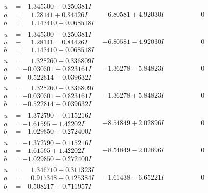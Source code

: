 \documentclass[1p]{elsarticle_modified}
\theoremstyle{definition}
\begin{document}
$$\begin{array}{c|c|c}
\begin{aligned}
u &= -1.345300 + 0.250381 I \\
a &= \phantom{-}1.28141 + 0.84426 I \\
b &= \phantom{-}1.143410 + 0.068518 I\end{aligned}
 & -6.80581 + 4.92030 I & \phantom{-0.000000 } 0 \\ \hline\begin{aligned}
u &= -1.345300 - 0.250381 I \\
a &= \phantom{-}1.28141 - 0.84426 I \\
b &= \phantom{-}1.143410 - 0.068518 I\end{aligned}
 & -6.80581 - 4.92030 I & \phantom{-0.000000 } 0 \\ \hline\begin{aligned}
u &= \phantom{-}1.328260 + 0.336809 I \\
a &= -0.030301 + 0.823161 I \\
b &= -0.522814 - 0.039632 I\end{aligned}
 & -1.36278 - 5.84823 I & \phantom{-0.000000 } 0 \\ \hline\begin{aligned}
u &= \phantom{-}1.328260 - 0.336809 I \\
a &= -0.030301 - 0.823161 I \\
b &= -0.522814 + 0.039632 I\end{aligned}
 & -1.36278 + 5.84823 I & \phantom{-0.000000 } 0 \\ \hline\begin{aligned}
u &= -1.372790 + 0.115216 I \\
a &= -1.61595 - 1.42202 I \\
b &= -1.029850 + 0.272400 I\end{aligned}
 & -8.54849 + 2.02896 I & \phantom{-0.000000 } 0 \\ \hline\begin{aligned}
u &= -1.372790 - 0.115216 I \\
a &= -1.61595 + 1.42202 I \\
b &= -1.029850 - 0.272400 I\end{aligned}
 & -8.54849 - 2.02896 I & \phantom{-0.000000 } 0 \\ \hline\begin{aligned}
u &= \phantom{-}1.346710 + 0.311323 I \\
a &= \phantom{-}0.917348 + 0.125384 I \\
b &= -0.508217 + 0.711957 I\end{aligned}
 & -1.61438 - 6.65221 I & \phantom{-0.000000 } 0 \\ \hline\begin{aligned}

\end{aligned}
\end{array}$$
\end{document}
